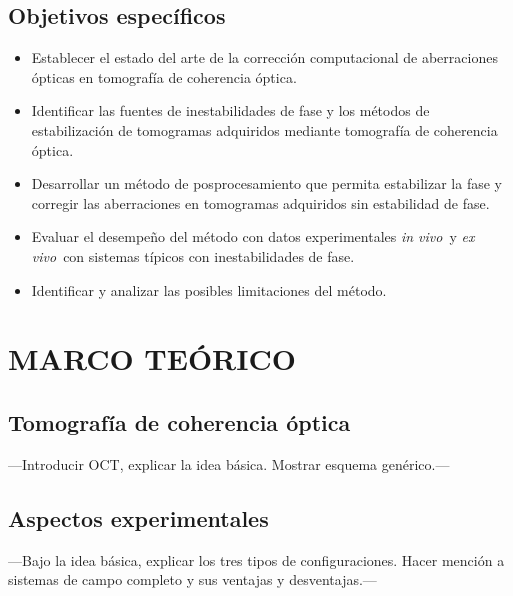\documentclass[letter, 12 pt]{article}
\newcommand{\invi}{\textit{in vivo}\ }
\newcommand{\exvi}{\textit{ex vivo}\ }
\begin{document}
\subsection{Objetivos específicos}

\begin{itemize}
    
    \item Establecer el estado del arte de la corrección computacional de aberraciones ópticas en tomografía de coherencia óptica.
    
    \item Identificar las fuentes de inestabilidades de fase y los métodos de estabilización de tomogramas adquiridos mediante tomografía de coherencia óptica.
    
    \item Desarrollar un método de posprocesamiento que permita estabilizar la fase y corregir las aberraciones en tomogramas adquiridos sin estabilidad de fase.
    
    \item Evaluar el desempeño del método con datos experimentales \invi y \exvi con sistemas típicos con inestabilidades de fase.
    
    \item Identificar y analizar las posibles limitaciones del método. \\
    
\end{itemize}



\section{MARCO TEÓRICO}

	\subsection{Tomografía de coherencia óptica}
---Introducir OCT, explicar la idea básica. Mostrar esquema genérico.---

	\subsection{Aspectos experimentales}
---Bajo la idea básica, explicar los tres tipos de configuraciones. Hacer mención a sistemas de campo completo y sus ventajas y desventajas.---
\end{document}
